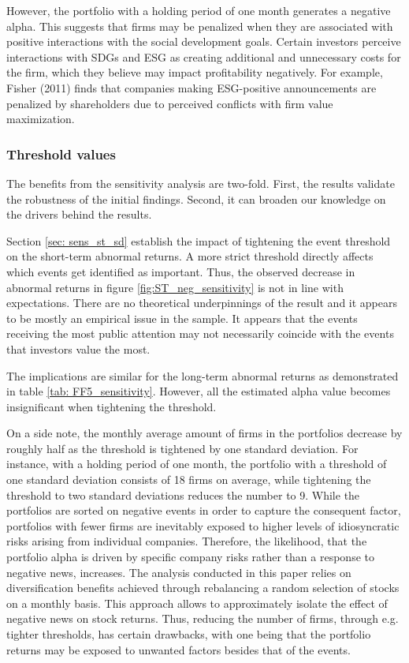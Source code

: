 However, the portfolio with a holding period of one month generates a negative alpha. This suggests that firms may be penalized when they are associated with positive interactions with the social development goals. Certain investors perceive interactions with SDGs and ESG as creating additional and unnecessary costs for the firm, which they believe may impact profitability negatively. For example, Fisher (2011) finds that companies making ESG-positive announcements are penalized by shareholders due to perceived conflicts with firm value maximization. 

\subsubsection{Threshold values}

The benefits from the sensitivity analysis are two-fold. First, the results validate the robustness of the initial findings. Second, it can broaden our knowledge on the drivers behind the results. 

Section \ref{sec: sens_st_sd} establish the impact of tightening the event threshold on the short-term abnormal returns. A more strict threshold directly affects which events get identified as important. Thus, the observed decrease in abnormal returns in figure \ref{fig:ST_neg_sensitivity} is not in line with expectations. There are no theoretical underpinnings of the result and it appears to be mostly an empirical issue in the sample. It appears that the events receiving the most public attention may not necessarily coincide with the events that investors value the most. 

The implications are similar for the long-term abnormal returns as demonstrated in table \ref{tab: FF5_sensitivity}. However, all the estimated alpha value becomes insignificant when tightening the threshold. 

On a side note, the monthly average amount of firms in the portfolios decrease by roughly half as the threshold is tightened by one standard deviation. For instance, with a holding period of one month, the portfolio with a threshold of one standard deviation consists of 18 firms on average, while tightening the threshold to two standard deviations reduces the number to 9. While the portfolios are sorted on negative events in order to capture the consequent factor, portfolios with fewer firms are inevitably exposed to higher levels of idiosyncratic risks arising from individual companies. Therefore, the likelihood, that the portfolio alpha is driven by specific company risks rather than a response to negative news, increases. The analysis conducted in this paper relies on diversification benefits achieved through rebalancing a random selection of stocks on a monthly basis. This approach allows to approximately isolate the effect of negative news on stock returns. Thus, reducing the number of firms, through e.g. tighter thresholds, has certain drawbacks, with one being that the portfolio returns may be exposed to unwanted factors besides that of the events. 


